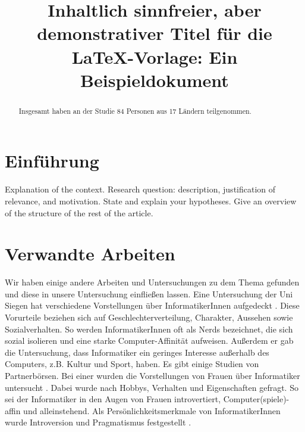 \documentclass[de]{agse-empir-report}\usepackage[]{graphicx}\usepackage[]{color}
\begin{document}
\title{Inhaltlich sinnfreier, aber demonstrativer Titel für die
    \LaTeX-Vorlage: Ein Beispieldokument}
\author{
    \and
    \and
    \and
    \and
}

\maketitle



\begin{abstract}
    \lipsum[1]
    Insgesamt haben an der Studie 84 Personen
    aus 17 Ländern teilgenommen.
\end{abstract}


\section[fz]{Einführung}
Explanation of the context.
Research question: description, justification of relevance,
and motivation.
State and explain your hypotheses.
Give an overview of the structure of the rest of the article.

\lipsum[2]


\section[kk]{Verwandte Arbeiten}
Wir haben einige andere Arbeiten und Untersuchungen zu dem Thema gefunden und diese in unsere Untersuchung einfließen lassen. Eine Untersuchung der Uni Siegen hat verschiedene Vorstellungen über InformatikerInnen aufgedeckt \cite{Weber09}. Diese Vorurteile beziehen sich auf Geschlechterverteilung, Charakter, Aussehen sowie Sozialverhalten. So werden InformatikerInnen oft als Nerds bezeichnet, die sich sozial isolieren und eine starke Computer-Affinität aufweisen. Außerdem er gab die Untersuchung, dass Informatiker ein geringes Interesse außerhalb des Computers, z.B. Kultur und Sport, haben. 
Es gibt einige Studien von Partnerbörsen. Bei einer wurden die Vorstellungen von Frauen über Informatiker untersucht \cite{partnersuche.de}. Dabei wurde nach Hobbys, Verhalten und Eigenschaften gefragt. So sei der Informatiker in den Augen von Frauen introvertiert, Computer(spiele)-affin und alleinstehend. Als Persönlichkeitsmerkmale von InformatikerInnen wurde Introversion und Pragmatismus festgestellt \cite{parship}.
\end{document}
